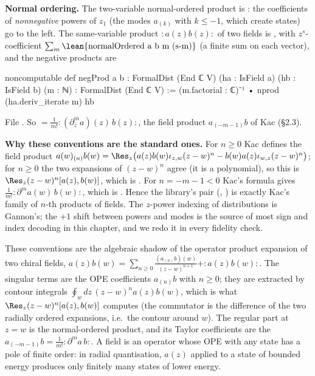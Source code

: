 \textbf{Normal ordering.} The two-variable normal-ordered product is
: the coefficients of
\emph{nonnegative} powers of $z_1$ (the modes $a_{(k)}$ with $k\le-1$, which create states) go to
the left. The same-variable product ${:}a(z)b(z){:}$ of two fields is , with
$z^s$-coefficient $\sum_m\text{\lean{normalOrdered a b m (s-m)}}$ (a finite sum on each vector),
and the negative products are
\begin{leancode}
noncomputable def negProd {a b : FormalDist (End ℂ V)} (ha : IsField a) (hb : IsField b)
    (m : ℕ) : FormalDist (End ℂ V) :=
  (m.factorial : ℂ)⁻¹ • nprod (ha.deriv_iterate m) hb
\end{leancode}
File . So 
$=\frac1{m!}{:}(\partial_z^ma)(z)\,b(z){:}$, the field product $a_{(-m-1)}b$ of Kac
(§2.3).

\begin{dictionary}
\textbf{Why these conventions are the standard ones.} For $n\ge0$ Kac defines the field product
$a(w)_{(n)}b(w) = \Res_z\big(a(z)b(w)\iota_{z,w}(z-w)^n - b(w)a(z)\iota_{w,z}(z-w)^n\big)$; for
$n\ge0$ the two expansions of $(z-w)^n$ agree (it is a polynomial), so this is
$\Res_z(z-w)^n[a(z),b(w)]$, which is . For $n=-m-1<0$ Kac's
formula gives $\frac1{m!}{:}\partial^ma(w)\,b(w){:}$, which is . Hence the library's
pair (, ) is exactly Kac's family of $n$-th products of fields. The
$z$-power indexing of distributions is Gannon's; the $+1$ shift between powers and modes is the
source of most sign and index decoding in this chapter, and we redo it in every fidelity check.
\end{dictionary}

\begin{physics}
These conventions are the algebraic shadow of the operator product expansion of two chiral fields,
$a(z)b(w) = \sum_{n\ge0}\frac{(a_{(n)}b)(w)}{(z-w)^{n+1}} + {:}a(z)b(w){:}$. The singular terms are
the OPE coefficients $a_{(n)}b$ with $n\ge0$; they are extracted by contour integrals
$\oint_w dz\,(z-w)^n a(z)b(w)$, which is what $\Res_{z}(z-w)^n[a(z),b(w)]$ computes (the commutator
is the difference of the two radially ordered expansions, i.e.\ the contour around $w$). The
regular part at $z=w$ is the normal-ordered product, and its Taylor coefficients are the
$a_{(-m-1)}b = \frac1{m!}{:}\partial^ma\,b{:}$. A field is an operator whose OPE with any state has a
pole of finite order: in radial quantisation, $a(z)$ applied to a state of bounded energy produces
only finitely many states of lower energy.
\end{physics}

